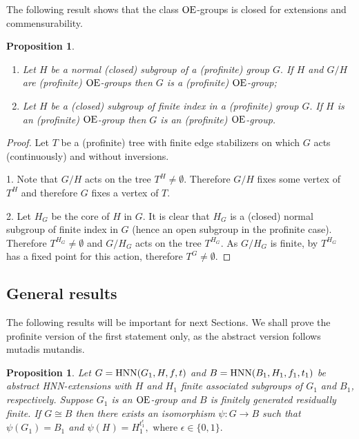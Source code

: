 \documentclass[a4paper,12pt]{article}
\newtheorem{prop}[thm]{Proposition}
\def\OE{{\rm OE}}
\def\hnn {{\rm HNN}}
\begin{document}
{The following result shows that  the class $\OE$-groups is  closed for extensions and commensurability.

\begin{prop} \label{extensao de OE group}  \begin{enumerate}
    \item[(i)] Let $H$ be a normal (closed) subgroup of a (profinite) group $G.$ If $H$ and $G/H$ are (profinite) $\OE$-groups then $G$ is a (profinite) $\OE$-group; 
      
    \item[(ii)]  Let $H$ be a (closed) subgroup of finite index in a (profinite) group $G.$ If $H$ is an (profinite) $\OE$-group then $G$ is an (profinite) $\OE$-group.     
\end{enumerate}
\end{prop} 

\begin{proof} Let $T$ be a (profinite) tree with finite edge stabilizers on which $G$ acts (continuously) and without inversions.  

1. Note that $G/H$ acts on the tree $T^{H} \neq \emptyset.$ Therefore $G/H$ fixes some vertex of $T^{ H}$ and therefore $ G$ fixes a vertex of $T.$ 

 2.  Let $H_{G}$ be the core of $H$ in $G.$ It is clear that $H_{G}$ is a (closed) normal subgroup of finite index in $G$ (hence an open subgroup in the profinite case). Therefore $T^{H_{G}} \neq \emptyset$ and $G/ H_{G}$ acts on the tree $T^{H_{G}}.$ As $G/ H_{G}$ is finite, by \cite[Theorem 2.10]{ZM} $T^{H_{G}}$ has a fixed point for this action, therefore  $T^{G} \neq \emptyset.$       
\end{proof} 


\subsection{ General results} \label{general results}

The following results will be important  for  next Sections. We shall prove the profinite version of the first statement only, as the abstract version follows mutadis mutandis.  

\begin{prop}\label{normal isomorfismo} Let $G = \hnn(G_{1}, H, f, t)$ and $B = \hnn(B_{1}, H_1, f_1, t_1)$ be abstract HNN-extensions with $H$ and $H_1$ finite associated subgroups of $G_1$ and $B_1$, respectively. 
Suppose $G_1$ is an $\OE$-group and $B$ is finitely generated  residually finite. If $G\cong B$ then there exists an isomorphism $\psi: G \longrightarrow B$ such that $\psi(G_1)= B_1$ and   $\psi(H)= H_1^{t_1^{\epsilon}}, \mbox{ where } \epsilon \in \{0,1\}.$  
\end{prop}



}
\end{document}
